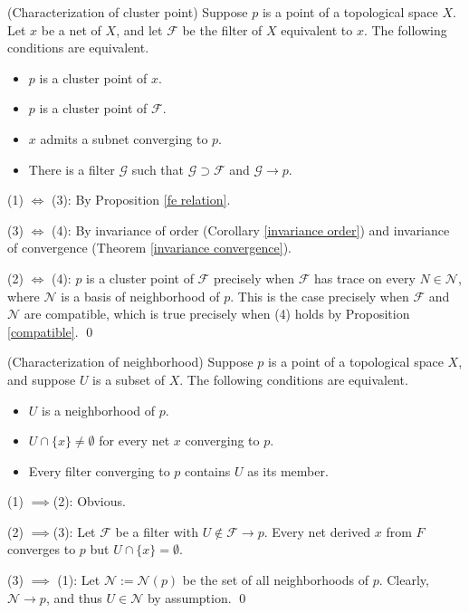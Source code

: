 \documentclass{report}
\begin{document}
\begin{prp}\label{characterize cluster point} (Characterization of cluster point)
    Suppose \( p \) is a point of a topological space \( X \). Let \( x \) be a net of \( X \), and let \( \mathscr{F} \) be the filter of \( X \) equivalent to \( x \). The following conditions are equivalent.
    \begin{itemize}
        \item[(1)] \( p \) is a cluster point of \( x \).
        \item[(2)] \( p \) is a cluster point of \( \mathscr{F} \).
        \item[(3)] \( x \) admits a subnet converging to \( p \).
        \item[(4)] There is a filter \( \mathscr{G} \) such that \( \mathscr{G} \supset \mathscr{F} \) and \( \mathscr{G} \to p \).
    \end{itemize}
\end{prp}
\begin{prf}
    (1) \( \iff \) (3): By Proposition \ref{fe relation}.

    (3) \( \iff \) (4): By invariance of order (Corollary \ref{invariance order})  and invariance of convergence (Theorem \ref{invariance convergence}).

    (2) \( \iff \) (4): \( p \) is a cluster point of \( \mathscr{F} \) precisely when \( \mathscr{F} \) has trace on every \( N \in \mathscr{N} \), where \( \mathscr{N} \) is a basis of neighborhood of \( p \). This is the case precisely when \( \mathscr{F} \) and \( \mathscr{N} \) are compatible, which is true precisely when (4) holds by Proposition \ref{compatible}.
    \qed\end{prf}

\begin{prp} (Characterization of neighborhood)
    Suppose \( p \) is a point of a topological space \( X \), and suppose \( U \) is a subset of \( X \). The following conditions are equivalent.
    \begin{itemize}
        \item[(1)] \( U \) is a neighborhood of \( p \).
        \item[(2)] \( U \cap \{x\} \neq \emptyset \) for every net \( x \) converging to \( p \).
        \item[(3)] Every filter converging to \( p \) contains \( U \) as its member.
    \end{itemize}
\end{prp}
\begin{prf}
    (1) \( \implies \)(2): Obvious.

    (2) \( \implies \)(3):
    Let \( \mathscr{F} \) be a filter with \( U \notin \mathscr{F} \to p \). Every net derived \( x \) from \( F \) converges to \( p \) but \( U \cap \{x\} = \emptyset \).

    (3) \( \implies \) (1): Let \( \mathscr{N}:=\mathscr{N}(p) \) be the set of all neighborhoods of \( p \). Clearly, \( \mathscr{N}\to p \), and thus \( U \in \mathscr{N} \) by assumption.
    \qed\end{prf}
\end{document}
